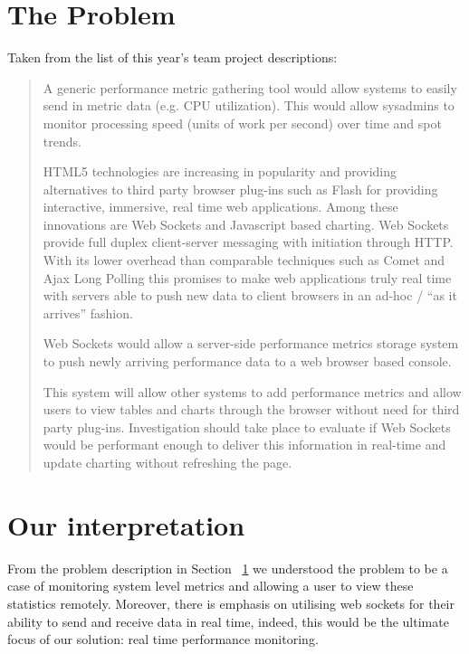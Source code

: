 \documentclass{l3proj}
\begin{document}
\section{The Problem}
\label{section:problem}


Taken from the list of this year's team project descriptions:

\begin{quotation}
A generic performance metric gathering tool would allow systems to easily send in metric data (e.g. CPU utilization). This would allow sysadmins to monitor processing speed (units of work per second) over time and spot trends.

HTML5 technologies are increasing in popularity and providing alternatives to third party browser plug-ins such as Flash for providing interactive, immersive, real time web applications. Among these innovations are Web Sockets and Javascript based charting.
Web Sockets provide full duplex client-server messaging with initiation through HTTP. With its lower overhead than comparable techniques such as Comet and Ajax Long Polling this promises to make web applications truly real time with servers able to push new data to client browsers in an ad-hoc / ``as it arrives'' fashion.

Web Sockets would allow a server-side performance metrics storage system to push newly arriving performance data to a web browser based console.

This system will allow other systems to add performance metrics and allow users to view tables and charts through the browser without need for third party plug-ins. Investigation should take place to evaluate if Web Sockets would be performant enough to deliver this information in real-time and update charting without refreshing the page.
\end{quotation}


\section{Our interpretation}


From the problem description in Section ~\ref{section:problem} we understood the problem to be a case of monitoring system level metrics and allowing a user to view these statistics remotely. Moreover, there is emphasis on utilising web sockets for their ability to send and receive data in real time, indeed, this would be the ultimate focus of our solution: real time performance monitoring.
\end{document}
